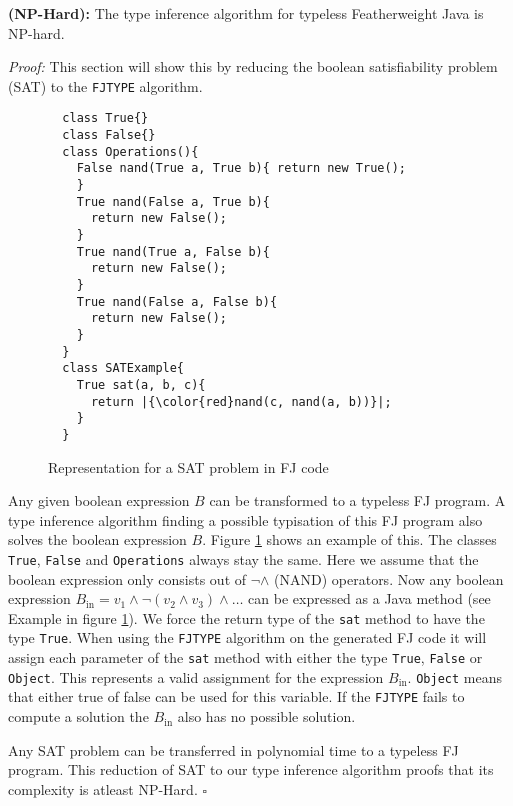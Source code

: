 
\begin{theoremAndi}
  \label{theo:np-hardness}
  \textbf{(NP-Hard):}
  The type inference algorithm for typeless Featherweight Java is NP-hard.
\end{theoremAndi}

\textit{Proof:} This section will show this by reducing the boolean satisfiability problem (SAT) to the \texttt{FJTYPE} algorithm.

\begin{figure}
\begin{lstlisting}
  class True{}
  class False{}
  class Operations(){
    False nand(True a, True b){ return new True();
    }
    True nand(False a, True b){
      return new False();
    }
    True nand(True a, False b){
      return new False();
    }
    True nand(False a, False b){
      return new False();
    }
  }
  class SATExample{
    True sat(a, b, c){
      return |{\color{red}nand(c, nand(a, b))}|;
    }
  }
\end{lstlisting}

\caption{Representation for a SAT problem in FJ code}
\label{fig:fjSATcode}
\end{figure}

Any given boolean expression $B$ can be transformed to a typeless FJ program.
A type inference algorithm finding a possible typisation of this FJ program also solves the boolean expression $B$.
Figure \ref{fig:fjSATcode} shows an example of this.
The classes \texttt{True}, \texttt{False} and \texttt{Operations} always stay the same.
Here we assume that the boolean expression only consists out of $\neg \land$ (NAND) operators.
Now any boolean expression $B_\text{in} = v_1 \land \neg (v_2 \land v_3) \land \ldots$ can be expressed as a Java method
(see  Example in figure \ref{fig:fjSATcode}).
We force the return type of the \texttt{sat} method to have the type \texttt{True}.
When using the \texttt{FJTYPE} algorithm on the generated FJ code it will
assign each parameter of the \texttt{sat} method with either the type \texttt{True}, \texttt{False}
or \texttt{Object}.
This represents a valid assignment for the expression $B_\text{in}$.
\texttt{Object} means that either true of false can be used for this variable.
If the \texttt{FJTYPE} fails to compute a solution the $B_\text{in}$ also has no possible solution.

Any SAT problem can be transferred in polynomial time to a typeless FJ program.
This reduction of SAT to our type inference algorithm proofs that its complexity is atleast NP-Hard.
\hfill $\square$

